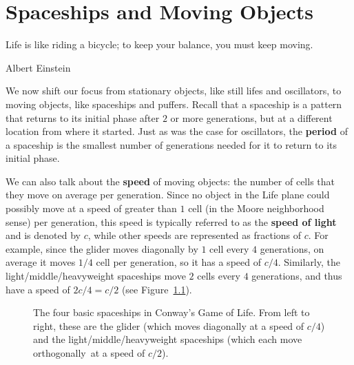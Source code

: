 
\renewcommand{\chapterfolder}{spaceships/}
\chapter{Spaceships and Moving Objects}\label{chp:spaceships}


\vspace*{-0.4in}
\epigraph{Life is like riding a bicycle; to keep your balance, you must keep moving.}{Albert Einstein}
\vspace*{0.4in}


\noindent We now shift our focus from stationary objects, like still lifes and oscillators, to moving objects, like spaceships and puffers. Recall that a spaceship is a pattern that returns to its initial phase after $2$ or more generations, but at a different location from where it started. Just as was the case for oscillators, the \textbf{period} of a spaceship is the smallest number of generations needed for it to return to its initial phase.

We can also talk about the \textbf{speed} of moving objects: the number of cells that they move on average per generation. Since no object in the Life plane could possibly move at a speed of greater than $1$ cell (in the Moore neighborhood sense) per generation, this speed is typically referred to as the \textbf{speed of light} and is denoted by $c$, while other speeds are represented as fractions of $c$. For example, since the glider moves diagonally by $1$ cell every $4$ generations, on average it moves $1/4$ cell per generation, so it has a speed of $c/4$. Similarly, the light/middle/heavyweight spaceships move $2$ cells every $4$ generations, and thus have a speed of $2c/4 = c/2$ (see Figure~\ref{fig:basic_spaceships}).

\begin{figure}[!htb]
	\centering
	\caption{The four basic spaceships in Conway's Game of Life. From left to right, these are the glider (which moves diagonally at a speed of $c/4$) and the light/middle/heavyweight spaceships (which each move orthogonally\protect\footnotemark \ at a speed of $c/2$).}\label{fig:basic_spaceships}
\end{figure}

